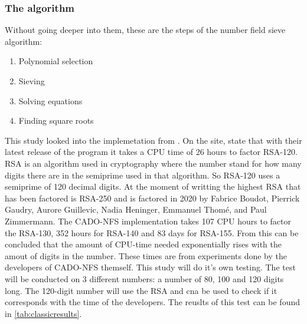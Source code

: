 \subsubsection{The algorithm}
Without going deeper into them, these are the steps of the number field sieve algorithm:
\begin{enumerate}
    \item Polynomial selection
    \item Sieving
    \item Solving equations
    \item Finding square roots
\end{enumerate}
This study looked into the implemetation from \textcite{cadoNFS}.
On the site, \textcite{cadoNFS} state that with their latest release of the program it takes a CPU time of 26 hours to factor RSA-120. RSA is an algorithm used in cryptography where the number stand for how many digits there are in the semiprime used in that algorithm.
So RSA-120 uses a semiprime of 120 decimal digits. At the moment of writting the highest RSA that has been factored is RSA-250 and is factored in 2020 by Fabrice Boudot, Pierrick Gaudry, Aurore Guillevic, Nadia Heninger, Emmanuel Thomé, and Paul Zimmermann.
The CADO-NFS implementation takes 107 CPU hours to factor the RSA-130, 352 hours for RSA-140 and 83 days for RSA-155. From this can be concluded that the amount of CPU-time needed exponentially rises with the amout of digits in the number.
These times are from experiments done by the developers of CADO-NFS themself. This study will do it's own testing.
The test will be conducted on 3 different numbers: a number of 80, 100 and 120 digits long. The 120-digit number will use the RSA and cna be used to check if it corresponds with the time of the developers.
The reuslts of this test can be found in \ref{tab:classicresults}.


